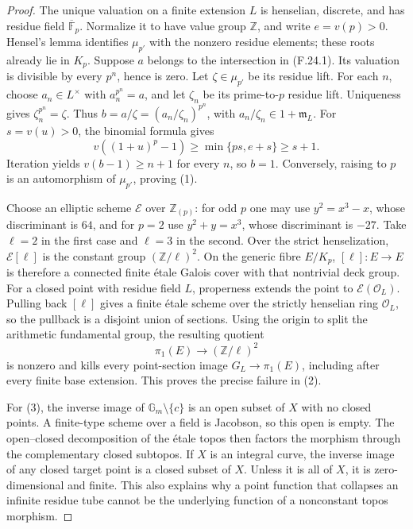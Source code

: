 \documentclass[11pt]{article}
\begin{document}
\begin{proof}
The unique valuation on a finite extension \(L\) is
henselian, discrete, and has residue field
\(\overline{\mathbb F}_p\). Normalize it to have value
group \(\mathbb Z\), and write \(e=v(p)>0\).
Hensel's lemma identifies \(\mu_{p'}\) with the
nonzero residue elements; these roots already lie
in \(K_p\). Suppose \(a\) belongs to the intersection
in (F.24.1). Its valuation is divisible by every
\(p^n\), hence is zero. Let \(\zeta\in\mu_{p'}\)
be its residue lift. For each \(n\), choose
\(a_n\in L^\times\) with \(a_n^{p^n}=a\), and
let \(\zeta_n\) be its prime-to-\(p\) residue lift.
Uniqueness gives \(\zeta_n^{p^n}=\zeta\).
Thus \(b=a/\zeta=(a_n/\zeta_n)^{p^n}\), with
\(a_n/\zeta_n\in1+\mathfrak m_L\).
For \(s=v(u)>0\), the binomial formula gives
\[
 v((1+u)^p-1)\geq\min\{ps,e+s\}\geq s+1.
\]
Iteration yields \(v(b-1)\geq n+1\) for every
\(n\), so \(b=1\). Conversely, raising to \(p\)
is an automorphism of \(\mu_{p'}\), proving (1).

Choose an elliptic scheme \(\mathcal E\) over
\(\mathbb Z_{(p)}\): for odd \(p\) one may use
\(y^2=x^3-x\), whose discriminant is \(64\),
and for \(p=2\) use \(y^2+y=x^3\), whose
discriminant is \(-27\). Take \(\ell=2\) in
the first case and \(\ell=3\) in the second.
Over the strict henselization, \(\mathcal E[\ell]\)
is the constant group \((\mathbb Z/\ell)^2\).
On the generic fibre \(E/K_p\),
\([\ell]:E\to E\) is therefore a connected
finite \'etale Galois cover with that nontrivial
deck group. For a closed point with residue field
\(L\), properness extends the point to
\(\mathcal E(\mathcal O_L)\). Pulling back
\([\ell]\) gives a finite \'etale scheme over
the strictly henselian ring \(\mathcal O_L\),
so the pullback is a disjoint union of sections.
Using the origin to split the arithmetic fundamental
group, the resulting quotient
\[
 \pi_1(E)\longrightarrow (\mathbb Z/\ell)^2
\]
is nonzero and kills every point-section image
\(G_L\to\pi_1(E)\), including after every finite
base extension. This proves the precise failure in (2).

For (3), the inverse image of
\(\mathbb G_m\setminus\{c\}\) is an open subset
of \(X\) with no closed points. A finite-type scheme
over a field is Jacobson, so this open is empty.
The open--closed decomposition of the \'etale topos
then factors the morphism through the complementary
closed subtopos. If \(X\) is an integral curve,
the inverse image of any closed target point is
a closed subset of \(X\). Unless it is all of
\(X\), it is zero-dimensional and finite. This
also explains why a point function that collapses
an infinite residue tube cannot be the underlying
function of a nonconstant topos morphism.


\end{proof}
\end{document}
